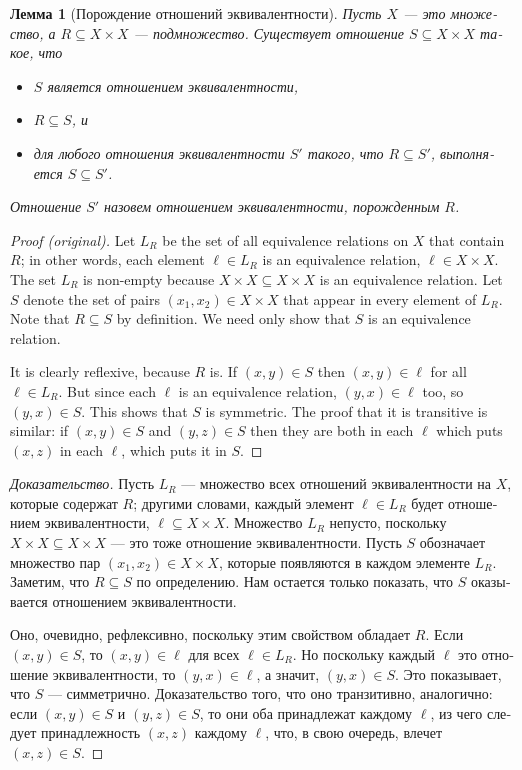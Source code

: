 \documentclass[a4paper]{book}
\def\ss{\subseteq}
\theoremstyle{myth}
\newenvironment{proofENG}{\begin{proof}[Proof (original)]}{\end{proof}}
\newtheorem{lemmaRUS}[envRUS]{Лемма}
\newenvironment{proofRUS}{\begin{proof}[Доказательство]}{\end{proof}}
\begin{document}
\begin{russian}
\begin{lemmaRUS}[Порождение отношений эквивалентности]\label{lemma:generating ERs}
Пусть $X$ — это множество, а $R\ss X\times X$ — подмножество. Существует отношение $S\ss X\times X$ такое, что
\begin{itemize}
\item $S$ является отношением эквивалентности,
\item $R\ss S$, и
\item для любого отношения эквивалентности $S'$ такого, что $R\ss S'$, выполняется $S\ss S'$.
\end{itemize}
Отношение $S'$ назовем {\em отношением эквивалентности, порожденным $R$}.
\end{lemmaRUS}

\begin{proofENG}
Let $L_R$ be the set of all equivalence relations on $X$ that contain $R$; in other words, each element $\ell\in L_R$ is an equivalence relation, $\ell\in X\times X$. The set $L_R$ is non-empty because $X\times X\ss X\times X$ is an equivalence relation. Let $S$ denote the set of pairs $(x_1,x_2)\in X\times X$ that appear in every element of $L_R$. Note that $R\ss S$ by definition. We need only show that $S$ is an equivalence relation.

It is clearly reflexive, because $R$ is. If $(x,y)\in S$ then $(x,y)\in\ell$ for all $\ell\in L_R$. But since each $\ell$ is an equivalence relation, $(y,x)\in\ell$ too, so $(y,x)\in S$. This shows that $S$ is symmetric. The proof that it is transitive is similar: if $(x,y)\in S$ and $(y,z)\in S$ then they are both in each $\ell$ which puts $(x,z)$ in each $\ell$, which puts it in $S$.
\end{proofENG}

\begin{proofRUS}
Пусть $L_R$ — множество всех отношений эквивалентности на $X$, которые содержат $R$; другими словами, каждый элемент $\ell\in L_R$ будет отношением эквивалентности, $\ell\ss X\times X$. Множество $L_R$ непусто, поскольку $X\times X\ss X\times X$ — это тоже отношение эквивалентности. Пусть $S$ обозначает множество пар $(x_1,x_2)\in X\times X$, которые появляются в каждом элементе $L_R$. Заметим, что $R\ss S$ по определению. Нам остается только показать, что $S$ оказывается отношением эквивалентности.

Оно, очевидно, рефлексивно, поскольку этим свойством обладает $R$. Если $(x,y)\in S$, то $(x,y)\in\ell$ для всех $\ell\in L_R$. Но поскольку каждый $\ell$ это отношение эквивалентности, то $(y,x)\in\ell$, а значит, $(y,x)\in S$. Это показывает, что $S$ — симметрично. Доказательство того, что оно транзитивно, аналогично: если $(x,y)\in S$ и $(y,z)\in S$, то они оба принадлежат каждому $\ell$, из чего следует принадлежность $(x,z)$ каждому $\ell$, что, в свою очередь, влечет $(x,z)\in S$.
\end{proofRUS}


\end{russian}
\end{document}
